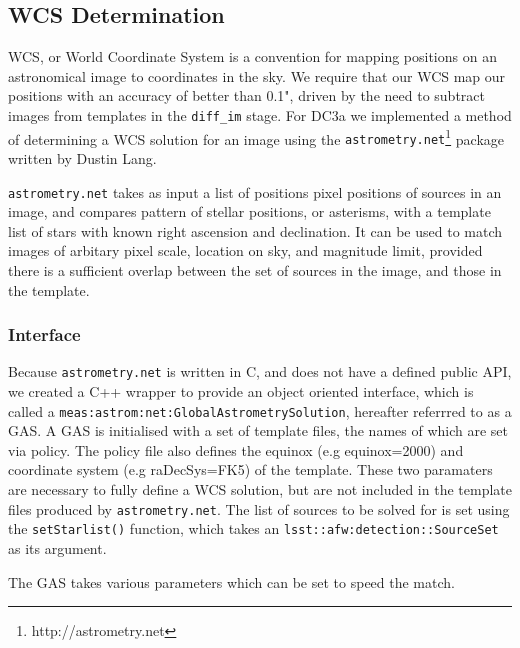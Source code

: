 
\subsection{WCS Determination} \label{sec:wcs}

WCS, or World Coordinate System is a convention for mapping positions on an astronomical image to coordinates in the sky. We require that our WCS map our positions with an accuracy of better than 0.1", driven by the need to subtract images from templates in the {\tt diff\_im} stage. For DC3a we implemented a method of determining a WCS solution for an image using the {\tt astrometry.net}\footnote{http://astrometry.net} package written by Dustin Lang. 

{\tt astrometry.net} takes as input a list of positions pixel positions of sources in an image, and compares pattern of stellar positions, or asterisms, with a template list of stars with known right ascension and declination. It can be used to match images of arbitary pixel scale, location on sky, and magnitude limit, provided there is a sufficient overlap between the set of sources in the image, and those in the template. 

\subsubsection{Interface}
Because {\tt astrometry.net} is written in C, and does not have a defined public API, we created a C++ wrapper to provide an object oriented interface, which is called a {\tt meas:astrom:net:GlobalAstrometrySolution}, hereafter referrred to as a GAS. A GAS is initialised with a set of template files, the names of which are set via policy. The policy file also defines the equinox (e.g equinox=2000) and coordinate system (e.g raDecSys=FK5) of the template. These two paramaters are necessary to fully define a WCS solution, but are not included in the template files produced by {\tt astrometry.net}. The list of sources to be solved for is set using the {\tt setStarlist()} function, which takes an {\tt lsst::afw:detection::SourceSet} as its argument.


The GAS takes various parameters which can be set to speed the match. 

